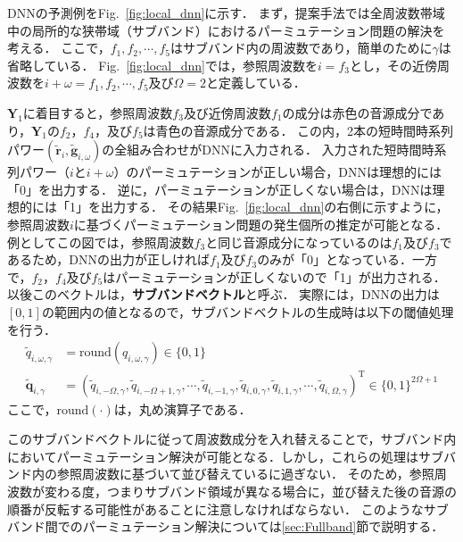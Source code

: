 DNNの予測例をFig.~\ref{fig:local_dnn}に示す．
まず，提案手法では全周波数帯域中の局所的な狭帯域（サブバンド）におけるパーミュテーション問題の解決を考える．
ここで，$f_1,f_2,\cdots,f_5$はサブバンド内の周波数であり，簡単のために$\gamma$は省略している．
Fig.~\ref{fig:local_dnn}では，参照周波数を$i = f_3$とし，その近傍周波数を$i+\omega = f_1, f_2,\cdots, f_5$及び$\Omega = 2$と定義している．

$\bm{Y}_1$に着目すると，参照周波数$f_3$及び近傍周波数$f_1$の成分は赤色の音源成分であり，$\bm{Y}_1$の$f_2$，$f_4$，及び$f_5$は青色の音源成分である．
この内，2本の短時間時系列パワー$(\tilde{\bm{r}}_{i}, \tilde{\bm{g}}_{i,\omega})$の全組み合わせがDNNに入力される．
入力された短時間時系列パワー（$i$と$i+\omega$）のパーミュテーションが正しい場合，DNNは理想的には「0」を出力する．
逆に，パーミュテーションが正しくない場合は，DNNは理想的には「1」を出力する．
その結果Fig.~\ref{fig:local_dnn}の右側に示すように，参照周波数$i$に基づくパーミュテーション問題の発生個所の推定が可能となる．
例としてこの図では，参照周波数$f_3$と同じ音源成分になっているのは$f_1$及び$f_3$であるため，DNNの出力が正しければ$f_1$及び$f_3$のみが「0」となっている．一方で，$f_2$，$f_4$及び$f_5$はパーミュテーションが正しくないので「1」が出力される．
以後このベクトルは，\textbf{サブバンドベクトル}と呼ぶ．
実際には，DNNの出力は$[0, 1]$の範囲内の値となるので，サブバンドベクトルの生成時は以下の閾値処理を行う．
\begin{align}
    \tilde{q}_{i, \omega, \gamma} &= \mathrm{round}(q_{i, \omega,\gamma}) \in \{0, 1\} \\
    \tilde{\bm{q}}_{i, \gamma} &= \left( \tilde{q}_{i, -\Omega, \gamma}, \tilde{q}_{i, -\Omega+1, \gamma}, \cdots, \tilde{q}_{i, -1, \gamma}, \tilde{q}_{i, 0, \gamma}, \tilde{q}_{i, 1, \gamma}, \cdots, \tilde{q}_{i, \Omega, \gamma} \right)^\mathrm{T} \in \{0,1\}^{2\Omega+1}
\end{align}
ここで，$\mathrm{round}(\cdot)$は，丸め演算子である．

このサブバンドベクトルに従って周波数成分を入れ替えることで，サブバンド内においてパーミュテーション解決が可能となる．しかし，これらの処理はサブバンド内の参照周波数に基づいて並び替えているに過ぎない．
そのため，参照周波数が変わる度，つまりサブバンド領域が異なる場合に，並び替えた後の音源の順番が反転する可能性があることに注意しなければならない．
このようなサブバンド間でのパーミュテーション解決については\ref{sec:Fullband}節で説明する．

